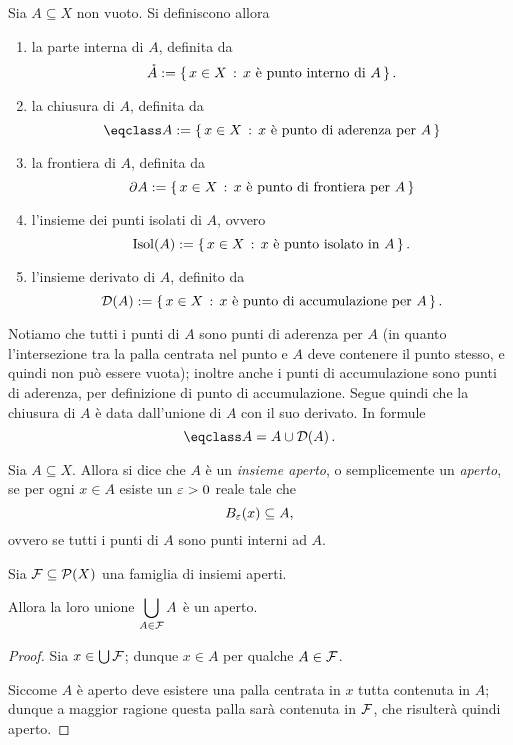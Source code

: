 \begin{definition}
     \label{def:caratt_punti_insiemi}
    Sia $A \subseteq X$ non vuoto. Si definiscono allora \begin{enumerate}
        \item la parte interna di $A$, definita da \[
            \mathring{A} := \left\{\,x \in X \,:\, x \text{ è punto interno di } A\,\right\}.
        \]
        \item la chiusura di $A$, definita da \[
            \closure{A} \deq \set{x \in X \suchthat x \text{ è punto di aderenza per } A}
        \]
        \item la frontiera di $A$, definita da \[
            \partial{A} := \left\{\,x \in X \,:\, x \text{ è punto di frontiera per } A\,\right\}   
        \]
        \item l'insieme dei punti isolati di $A$, ovvero \[
            \operatorname{Isol}(A) := \left\{\,x \in X \,:\, x \text{ è punto isolato in } A\,\right\}.
        \]
        \item l'insieme derivato di $A$, definito da \[
            \mathcal{D}\!\left(A\right) := \left\{\,x \in X \,:\, x \text{ è punto di accumulazione per } A\,\right\}.
        \]
    \end{enumerate}
\end{definition}

\begin{remark}
    Notiamo che tutti i punti di $A$ sono punti di aderenza per $A$ (in quanto l'intersezione tra la palla centrata nel punto e $A$ deve contenere il punto stesso, e quindi non può essere vuota); inoltre anche i punti di accumulazione sono punti di aderenza, per definizione di punto di accumulazione. Segue quindi che la chiusura di $A$ è data dall'unione di $A$ con il suo derivato. In formule \[
        \closure{A} = A \union \derived{A}.    
    \]
\end{remark}

\begin{definition}
     \label{def:aperto}
    Sia $A \subseteq X$. Allora si dice che $A$ è un \emph{insieme aperto}, o semplicemente un \emph{aperto}, se per ogni $x \in A$ esiste un $\varepsilon > 0$ reale tale che \[
        B_{\varepsilon}\!\left(x\right) \subseteq A,    
    \] ovvero se tutti i punti di $A$ sono punti interni ad $A$.
\end{definition}

\begin{proposition}
    \label{prop:unione_aperti}
    Sia $\mathcal{F} \subseteq \mathcal{P}\!\left(X\right)$ una famiglia di insiemi aperti.

    Allora la loro unione $\displaystyle \bigcup_{A \in \mathcal{F}} A$ è un aperto.
\end{proposition}
\begin{proof}
    Sia $x \in \bigcup \mathcal{F}$; dunque $x \in A$ per qualche $A \in \mathcal{F}$. 

    Siccome $A$ è aperto deve esistere una palla centrata in $x$ tutta contenuta in $A$; dunque a maggior ragione questa palla sarà contenuta in $\mathcal{F}$, che risulterà quindi aperto.
\end{proof}

